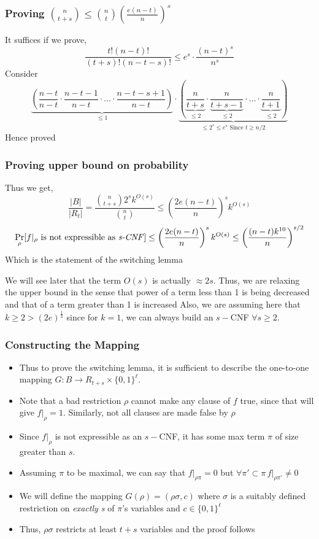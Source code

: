 \documentclass{beamer}[11pt]
\newcommand\Fontvi{\fontsize{10}{7.2}\selectfont}
\begin{document}
\begin{frame}
 \frametitle{Proving $\binom{n}{t+s} \leq \binom{n}{t}\left(\frac{e(n-t) }{n }\right)^s $}
 It suffices if we prove,
\[
 \frac{t!(n-t)!}{(t+s)!(n-t-s)! } \leq e^s\cdot \frac{(n-t)^s}{n^s}  
\]
Consider
\[
 \underbrace{\left(\frac{n-t}{n-t}\cdot\frac{n-t-1}{n-t}\cdot\ldots\cdot \frac{n-t-s+1}{n-t} \right)}_{\leq 1}\cdot\underbrace{\left(\underbrace{\frac{n}{t+s}}_{\leq 2}\cdot\underbrace{\frac{n}{t+s-1}}_{\leq 2}\cdot\ldots\cdot\underbrace{\frac{n}{t+1}}_{\leq 2} \right)}_{\leq 2^s \leq e^s \text{ Since }t\geq n/2 }
\]
Hence proved
\end{frame}
\begin{frame}
\frametitle{Proving upper bound on probability}
\Fontvi
 Thus we get,
 \[
 \frac{|B|}{|R_t|} = \frac{\binom{n}{t+s}2^sk^{O(s)} }{\binom{n}{t} } \leq \left(\frac{2e(n-t) }{n }\right)^sk^{O(s) }
 \]
 \[
 \Pr\limits_{\rho}[f|_{\rho} \text{ is not expressible as \emph{s-CNF}} ]\leq \left(\frac{2e(n-t) }{n }\right)^{s }k^{O(s)} \leq \left(\frac{(n-t)k^{10} }{n}\right)^{s/2}
 \]
 Which is the statement of the switching lemma
 
 We will see later that the term $O(s) $ is actually $\approx 2s $. Thus, we are relaxing the upper bound in the sense that power of a term less than 1 is being decreased and that of a term greater than 1 is increased
 \pause
 Also, we are assuming here that $k\geq 2 > (2e)^{\frac{1}{3} } $ since for $k=1$, we can always build an $s-$CNF $\forall s\geq 2$.
\end{frame}

\begin{frame}
\frametitle{Constructing the Mapping}
\begin{itemize}
 \item Thus to prove the switching lemma, it is sufficient to describe the one-to-one mapping $G:B \rightarrow R_{t+s}\times \{0,1\}^\ell$.
 \item Note that a bad restriction $\rho$ cannot make any clause of $f$ true, since that will give $f|_\rho=1$. Similarly, not all clauses are made false by $\rho$
 \item Since $f|_\rho$ is not expressible as an $s-$CNF, it has some max term $\pi$ of size greater than $s$.
 \item Assuming $\pi$ to be maximal, we can say that $f|_{\rho\pi} = 0$ but $\forall \pi' \subset \pi\, f|_{\rho\pi'}\neq 0 $
 \item We will define the mapping $G(\rho) =(\rho\sigma,c) $ where $\sigma$ is a suitably defined restriction on \emph{exactly s} of $\pi$'s variables and $c\in\{0,1\}^\ell $
 \item Thus, $\rho\sigma$ restricts at least $t+s$ variables and the proof follows
\end{itemize}


\end{frame}
\end{document}
